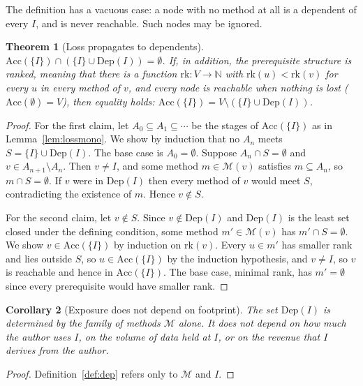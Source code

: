 \documentclass[11pt]{article}
\theoremstyle{plain}
\newtheorem{theorem}{Theorem}[section]
\newtheorem{corollary}[theorem]{Corollary}
\theoremstyle{definition}
\theoremstyle{remark}
\newcommand{\Nat}{\mathbb{N}}
\begin{document}
The definition has a vacuous case: a node with no method at all is a dependent of every $I$, and is never reachable. Such nodes may be ignored.

\begin{theorem}[Loss propagates to dependents]\label{thm:propagate}
$\mathrm{Acc}(\{I\})\cap(\{I\}\cup\mathrm{Dep}(I))=\emptyset$. If, in addition, the prerequisite structure is \emph{ranked}, meaning that there is a function $\mathrm{rk}:V\to\Nat$ with $\mathrm{rk}(u)<\mathrm{rk}(v)$ for every $u$ in every method of $v$, and every node is reachable when nothing is lost ($\mathrm{Acc}(\emptyset)=V$), then equality holds: $\mathrm{Acc}(\{I\})=V\setminus(\{I\}\cup\mathrm{Dep}(I))$.
\end{theorem}

\begin{proof}
For the first claim, let $A_0\subseteq A_1\subseteq\cdots$ be the stages of $\mathrm{Acc}(\{I\})$ as in Lemma~\ref{lem:lossmono}. We show by induction that no $A_n$ meets $S=\{I\}\cup\mathrm{Dep}(I)$. The base case is $A_0=\emptyset$. Suppose $A_n\cap S=\emptyset$ and $v\in A_{n+1}\setminus A_n$. Then $v\neq I$, and some method $m\in\mathcal M(v)$ satisfies $m\subseteq A_n$, so $m\cap S=\emptyset$. If $v$ were in $\mathrm{Dep}(I)$ then every method of $v$ would meet $S$, contradicting the existence of $m$. Hence $v\notin S$.

For the second claim, let $v\notin S$. Since $v\notin\mathrm{Dep}(I)$ and $\mathrm{Dep}(I)$ is the least set closed under the defining condition, some method $m'\in\mathcal M(v)$ has $m'\cap S=\emptyset$. We show $v\in\mathrm{Acc}(\{I\})$ by induction on $\mathrm{rk}(v)$. Every $u\in m'$ has smaller rank and lies outside $S$, so $u\in\mathrm{Acc}(\{I\})$ by the induction hypothesis, and $v\neq I$, so $v$ is reachable and hence in $\mathrm{Acc}(\{I\})$. The base case, minimal rank, has $m'=\emptyset$ since every prerequisite would have smaller rank. \qedhere
\end{proof}

\begin{corollary}[Exposure does not depend on footprint]\label{cor:footprint}
The set $\mathrm{Dep}(I)$ is determined by the family of methods $\mathcal M$ alone. It does not depend on how much the author uses $I$, on the volume of data held at $I$, or on the revenue that $I$ derives from the author.
\end{corollary}

\begin{proof}
Definition~\ref{def:dep} refers only to $\mathcal M$ and $I$. \qedhere
\end{proof}
\end{document}
